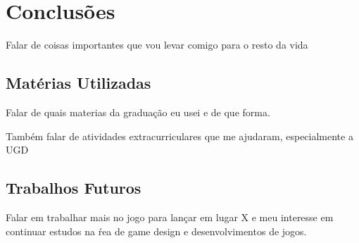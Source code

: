\chapter{Conclusões}
\label{cap:conclusoes}

Falar de coisas importantes que vou levar comigo para o resto da vida

\section{Matérias Utilizadas}
\label{sec:materias_utilizadas}

Falar de quais materias da graduação eu usei e de que forma.

Também falar de atividades extracurriculares que me ajudaram, especialmente a UGD

\section{Trabalhos Futuros}
\label{sec:trabalhos_futuros}

Falar em trabalhar mais no jogo para lançar em lugar X e meu interesse em continuar estudos na ŕea de game design e desenvolvimentos de jogos.
